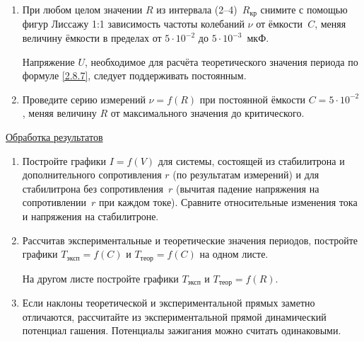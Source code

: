 \begin{lab:task}
\begin{enumerate}
		\item При любом целом значении $R$ из интервала (2--4)~$R_{\text{кр}}$ снимите с помощью фигур Лиссажу 1:1 зависимость частоты
колебаний $\nu$ от ёмкости~$C$, меняя величину ёмкости в пределах от $5\cdot10^{-2}$ до $5\cdot10^{-3}$~мкФ.

Напряжение $U$, необходимое для расчёта теоретического значения периода по формуле \eqref{2.8.7}, следует поддерживать
постоянным.

		\item Проведите серию измерений $\nu=f(R)$ при постоянной ёмкости $C=5\cdot10^{-2}$, меняя величину $R$ от максимального
значения до критического.
	\end{enumerate}
		    \begin{center}
		    \underline{Обработка результатов}
		    \end{center}
	\begin{enumerate}
		\item Постройте графики $I=f(V)$ для системы, состоящей из стабилитрона и дополнительного сопротивления $r$ (по результатам
измерений) и для стабилитрона без сопротивления~$r$ (вычитая падение напряжения на сопротивлении~$r$ при каждом токе).
Сравните относительные изменения тока и напряжения на стабилитроне.

		\item Рассчитав экспериментальные и теоретические значения периодов, постройте графики $T_{\text{эксп}}=f(C)$ и $T_{\text{теор}}=f(C)$ на
одном листе.

На другом листе постройте графики $T_{\text{эксп}}$ и $T_{\text{теор}}=f(R)$.

		\item Если наклоны теоретической и экспериментальной прямых заметно отличаются, рассчитайте из экспериментальной прямой
динамический потенциал гашения. Потенциалы зажигания можно считать одинаковыми.
	\end{enumerate}
\end{lab:task}

